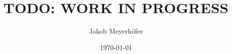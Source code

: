 \makeatletter %


\title{TODO: WORK IN PROGRESS}




\author{Jakob Meyerhöfer}
\newcommand{\authorShort}{J. Meyerhöfer}
\newcommand{\firstName}{Jakob}
\newcommand{\middleName}{Elias}
\newcommand{\lastName}{Meyerhöfer}
\newcommand{\initials}{JM}
\newcommand{\mail}{meyerhoe@rptu.de}
\newcommand{\city}{Rodalben}




\newcommand{\thesislang}{eng}
\date{\today} %




\newcommand{\examinerA}{Prof. Dr. Ralf Hinze}
\newcommand{\examinerB}{Cass Alexandru (Gregor Cassian Alexandru), M.Sc.}
\newcommand{\thesisType}{Bachelor}




